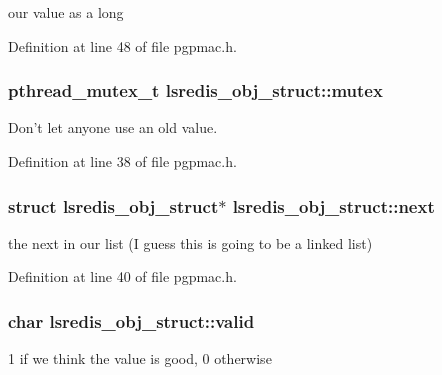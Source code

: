 our value as a long 



Definition at line 48 of file pgpmac.\-h.

\hypertarget{structlsredis__obj__struct_a0da18e7d0f7d52459bbc6fbc696d5252}{
\subsubsection[{mutex}]{\setlength{\rightskip}{0pt plus 5cm}pthread\-\_\-mutex\-\_\-t lsredis\-\_\-obj\-\_\-struct\-::mutex}}\label{structlsredis__obj__struct_a0da18e7d0f7d52459bbc6fbc696d5252}


Don't let anyone use an old value. 



Definition at line 38 of file pgpmac.\-h.

\hypertarget{structlsredis__obj__struct_afb7259e8c3c1c83ccc234b2b2894f2b0}{
\subsubsection[{next}]{\setlength{\rightskip}{0pt plus 5cm}struct {\bf lsredis\-\_\-obj\-\_\-struct}$\ast$ lsredis\-\_\-obj\-\_\-struct\-::next}}\label{structlsredis__obj__struct_afb7259e8c3c1c83ccc234b2b2894f2b0}


the next in our list (I guess this is going to be a linked list) 



Definition at line 40 of file pgpmac.\-h.

\hypertarget{structlsredis__obj__struct_a338ffa4123bd06b39c8b58f5e695575e}{
\subsubsection[{valid}]{\setlength{\rightskip}{0pt plus 5cm}char lsredis\-\_\-obj\-\_\-struct\-::valid}}\label{structlsredis__obj__struct_a338ffa4123bd06b39c8b58f5e695575e}


1 if we think the value is good, 0 otherwise 




